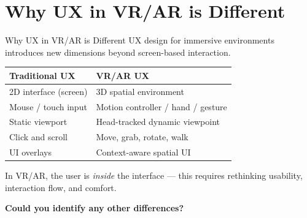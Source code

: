 \documentclass[aspectratio=169, table]{beamer}
\begin{document}
\section{Why UX in VR/AR is Different}
\begin{frame}{Why UX in VR/AR is Different}
	\vspace{20pt}
	UX design for immersive environments introduces new dimensions beyond screen-based interaction.
	
	\vspace{5pt}
	\begin{center}
		
		\begin{tabular}{|p{4cm}|p{6cm}|}
			\hline
			\rowcolor{gray!10}
			\textbf{Traditional UX} & \textbf{VR/AR UX} \\
			\hline
			2D interface (screen) & 3D spatial environment \\
			\hline
			Mouse / touch input & Motion controller / hand / gesture \\
			\hline
			Static viewport & Head-tracked dynamic viewpoint \\
			\hline
			Click and scroll & Move, grab, rotate, walk \\
			\hline
			UI overlays & Context-aware spatial UI \\
			\hline
		\end{tabular}
		
	\end{center}
	
	\vspace{5pt}
	In VR/AR, the user is \textit{inside} the interface — this requires rethinking usability, interaction flow, and comfort.
	
	\vspace{5pt}
	\centering
	\large
	\textbf{Could you identify any other differences?}
\end{frame}
\end{document}
